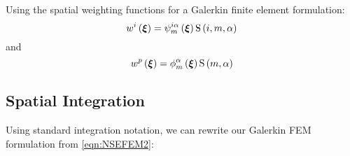 Using the spatial weighting functions for a Galerkin finite element
formulation:
\begin{equation}
  \fnof{w^{i}}{\vectr{\xi}}=\idxgbfn{i}{m}{\alpha}{\vectr{\xi}}\idxgsf{i}{m}{\alpha}
\end{equation}
and
\begin{equation}
  \fnof{w^{p}}{\vectr{\xi}}=\altgbfn{m}{\alpha}{\vectr{\xi}}\gsf{m}{\alpha}
\end{equation}


\subsection{Spatial Integration}

Using standard integration notation, we can rewrite our Galerkin FEM
formulation from \ref{eqn:NSEFEM2}:

